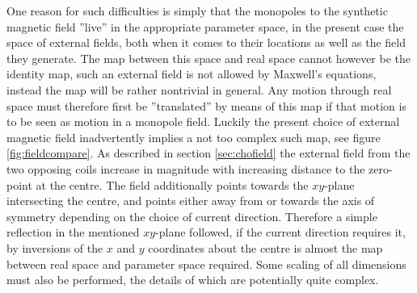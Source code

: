 \documentclass[main.tex]{subfiles}
\begin{document}
One reason for such difficulties is simply that the monopoles to the synthetic magnetic
field ''live'' in the appropriate parameter space, in the present case the space of
external fields, both when it comes to their locations as
well as the field they generate. 
The map between this space and real space cannot however be  the identity map, such an external
field is not allowed by Maxwell's equations,  instead the map will be rather nontrivial in general.
Any motion through real space must therefore first be ''translated'' by means of this map
if that motion is to be seen as motion in a monopole field. Luckily the present choice of
external magnetic field inadvertently implies a not too complex such map, see figure
\ref{fig:fieldcompare}. As described in
section \ref{sec:chofield} the external field from the two opposing coils increase in
magnitude with increasing distance to the zero-point at the centre. The field additionally
points towards the \(xy\)-plane intersecting the centre, and points either away
from or towards the axis of symmetry depending on the choice of current direction.
Therefore a simple reflection in the mentioned \(xy\)-plane followed, if the current
direction requires it, by inversions of the \(x\) and \(y\) coordinates about the centre is
almost the map between real space and parameter space required. Some scaling of all
dimensions must also be performed, the details of which are potentially quite complex.
\end{document}
